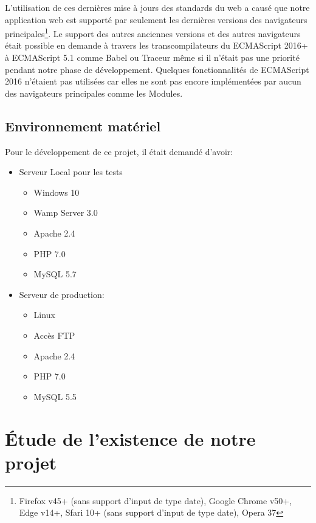 L'utilisation de ces dernières mise à jours des standards du web a causé que
notre application web est supporté par seulement les dernières versions des
navigateurs principales\footnote{Firefox v45+ (sans support d'input de type
date), Google Chrome v50+, Edge v14+, Sfari 10+ (sans support d'input de type
date), Opera 37}. Le support des autres anciennes versions et des autres
navigateurs était possible en demande à travers les transcompilateurs du
ECMAScript 2016+ à ECMAScript 5.1 comme Babel ou Traceur même si il n'était pas
une priorité pendant notre phase de développement. Quelques fonctionnalités de
ECMAScript 2016 n'étaient pas utilisées car elles ne sont pas encore
implémentées par aucun des navigateurs principales comme les Modules.

\subsection{Environnement matériel}

Pour le développement de ce projet, il était demandé d'avoir:

\begin{itemize}
    \item Serveur Local pour les tests
        \begin{itemize}
            \item Windows 10
            \item Wamp Server 3.0
            \item Apache 2.4
            \item PHP 7.0
            \item MySQL 5.7
        \end{itemize}
    \item Serveur de production:
        \begin{itemize}
            \item Linux
            \item Accès FTP
            \item Apache 2.4
            \item PHP 7.0
            \item MySQL 5.5
        \end{itemize}
\end{itemize}

\section{Étude de l'existence de notre projet}

